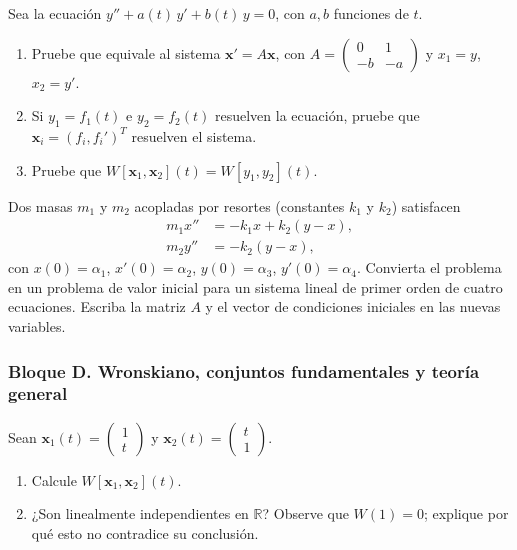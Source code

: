 \begin{exercise}[\est{2}]\label{ex:C7}
Sea la ecuación $y'' + a(t)\,y' + b(t)\,y = 0$, con $a,b$ funciones de $t$.
\begin{enumerate}[a]
    \item Pruebe que equivale al sistema $\mathbf{x}' = A\mathbf{x}$, con $A = \begin{pmatrix} 0 & 1\\ -b & -a\end{pmatrix}$ y $x_1 = y$, $x_2 = y'$.
    \item Si $y_1 = f_1(t)$ e $y_2 = f_2(t)$ resuelven la ecuación, pruebe que $\mathbf{x}_i = (f_i, f_i')^{T}$ resuelven el sistema.
    \item Pruebe que $W[\mathbf{x}_1,\mathbf{x}_2](t) = W[y_1,y_2](t)$.
\end{enumerate}
\end{exercise}

\begin{exercise}[\est{3}]\label{ex:C8}
Dos masas $m_1$ y $m_2$ acopladas por resortes (constantes $k_1$ y $k_2$) satisfacen
\begin{align*}
    m_1 x'' &= -k_1 x + k_2 (y - x), \\
    m_2 y'' &= -k_2 (y - x),
\end{align*}
con $x(0) = \alpha_1$, $x'(0) = \alpha_2$, $y(0) = \alpha_3$, $y'(0) = \alpha_4$. Convierta el problema en un problema de valor inicial para un sistema lineal de primer orden de cuatro ecuaciones. Escriba la matriz $A$ y el vector de condiciones iniciales en las nuevas variables.
\end{exercise}

\subsubsection*{Bloque D. Wronskiano, conjuntos fundamentales y teoría general}

\begin{exercise}[\est{1}]\label{ex:D1}
Sean $\mathbf{x}_1(t) = \begin{pmatrix}1\\ t\end{pmatrix}$ y $\mathbf{x}_2(t) = \begin{pmatrix}t\\ 1\end{pmatrix}$.
\begin{enumerate}[a]
    \item Calcule $W[\mathbf{x}_1,\mathbf{x}_2](t)$.
    \item ¿Son linealmente independientes en $\mathbb{R}$? Observe que $W(1)=0$; explique por qué esto no contradice su conclusión.
\end{enumerate}
\end{exercise}

